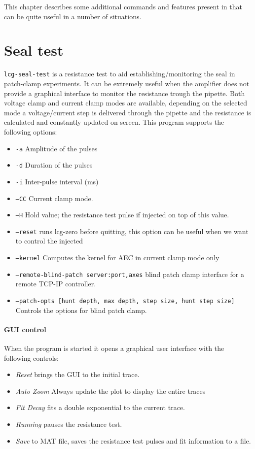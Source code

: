 This chapter describes some additional commands and features present
in \progname that can be quite useful in a number of situations.

\section{Seal test}

\texttt{lcg-seal-test} is a resistance test to aid establishing/monitoring the seal in patch-clamp experiments. It can be extremely useful when the amplifier does not provide a graphical interface to monitor the resistance trough the pipette. Both voltage clamp and current clamp modes are available, depending on the selected mode a voltage/current step is delivered through the pipette and the resistance is calculated and constantly updated on screen. 
This program supports the following options:

\begin{itemize}
\item{\texttt{-a}} Amplitude of the pulses 
\item{\texttt{-d}} Duration of the pulses
\item{\texttt{-i}} Inter-pulse interval (ms)
\item{\texttt{--CC}} Current clamp mode.
\item{\texttt{--H}} Hold value; the resistance test pulse if injected on top of this value.
\item{\texttt{--reset}} runs lcg-zero before quitting, this option can be useful when we want to control the injected 
\item{\texttt{--kernel}} Computes the kernel for AEC in current clamp mode only
\item{\texttt{--remote-blind-patch server:port,axes}} blind patch clamp interface for a remote TCP-IP controller.
\item{\texttt{--patch-opts [hunt depth, max depth, step size, hunt step size]}}  Controls the options for blind patch clamp.
\end{itemize}

\paragraph{GUI control} When the program is started it opens a graphical user interface with the following controls:
\begin{itemize}
\item{\emph{Reset}} brings the GUI to the initial trace.
\item{\emph{Auto Zoom}} Always update the plot to display the entire traces
\item{\emph{Fit Decay}} fits a double exponential to the current trace.
\item{\emph{Running}} pauses the resistance test.
\item{\emph{Save}} to MAT file, saves the resistance test pulses and fit information to a file.
\end{itemize}

